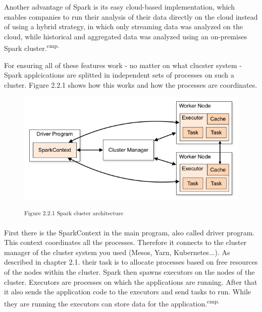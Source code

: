
Another advantage of Spark is its easy cloud-based implementation, which enables companies to run their analysis of their data directly on the cloud instead of using a hybrid strategy, in which only streaming data was analyzed on the cloud, while historical and aggregated data was analyzed using an on-premises Spark cluster.\textsuperscript{cmp.\cite{23}}


For ensuring all of these features work - no matter on what clucster system - Spark applcications are splitted in independent sets of processes on such a cluster. Figure 2.2.1 shows how this works and how the processes are coordinates.

\begin{figure}[h]
\centering
\includegraphics[width=\textwidth/4*3]{images/spark_cluster_architecture.png}

\textsuperscript{Figure 2.2.1 Spark cluster architecture\cite{24}}
\end{figure}

First there is the SparkContext in the main program, also called driver program. This context coordinates all the processes. Therefore it connects to the cluster manager of the cluster system you used (Mesos, Yarn, Kubernetes...). As described in chapter 2.1. their task is to allocate processes based on free resources of the nodes within the cluster. Spark then spawns executors on the nodes of the cluster. Executors are processes on which the applications are running. After that it also sends the application code to the executors and send tasks to run. While they are running the executors can store data for the application.\textsuperscript{cmp.\cite{25}}

